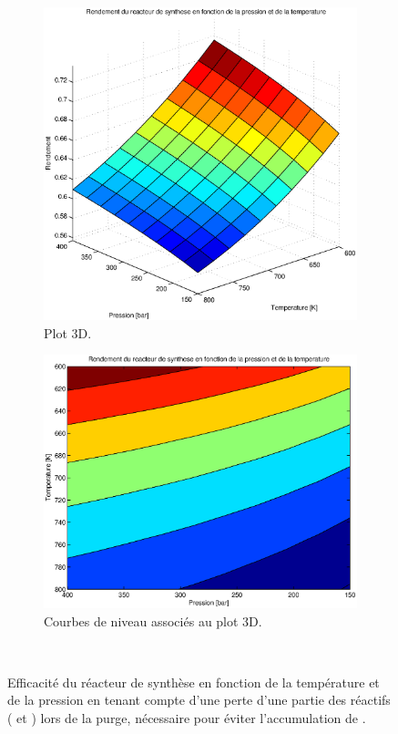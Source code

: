 \begin{figure}
	\centering
	\begin{subfigure}[b]{1\textwidth}
		\includegraphics[scale=0.7]{../tache2/img/efficienceSyntheseS.eps}
		\caption{Plot 3D.}
		\label{fig:efficienceS}
	\end{subfigure}
	\begin{subfigure}[b]{0.8\textwidth}
		\includegraphics[scale=0.6]{../tache2/img/efficienceSyntheseC.eps}
		\caption{Courbes de niveau associés au plot 3D.}
		\label{fig:efficienceC}
	\end{subfigure} \\
	\caption{Efficacité du réacteur de synthèse en fonction de la température 
		et de la pression en tenant compte d'une perte d'une partie des 
		réactifs ( et ) lors de la purge, nécessaire pour
		éviter l'accumulation de .}
\end{figure}

